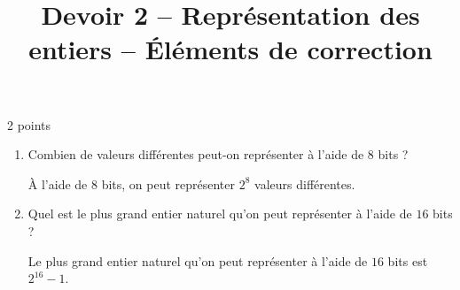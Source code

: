 \documentclass[a4paper,dvipsnames]{article}
\title{Devoir 2 -- Représentation des entiers -- Éléments de correction}
\author{}
\date{}
\begin{document}
\renewcommand{\contentsname}{}

\pagestyle{fancy}

\begin{tcolorbox}[colframe=blue!75, colback=blue!45, valign=center, height=1.5cm, top=5mm]
  \maketitle
\end{tcolorbox}


\vspace{1cm}

\thispagestyle{fancy}

\begin{exercice}{2 points}{}
 \begin{enumerate}
   \item Combien de valeurs différentes peut-on représenter à l'aide de $8$ bits ?

     \begin{correction}
       À l'aide de $8$ bits, on peut représenter $2^8$ valeurs différentes.
     \end{correction}
     
   \item Quel est le plus grand entier naturel qu'on peut représenter à l'aide de $16$ bits ?

     \begin{correction}
       Le plus grand entier naturel qu'on peut représenter à l'aide de $16$ bits est $2^{16}-1$.
     \end{correction}
     
 \end{enumerate} 
\end{exercice}

\medskip
\end{document}
